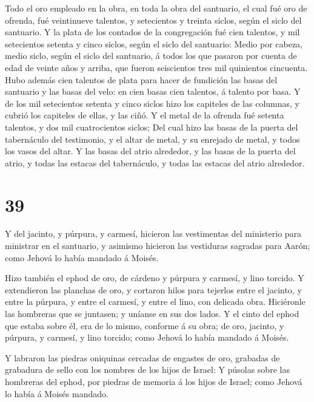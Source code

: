  Todo el oro empleado en la obra, en toda la obra del
santuario, el cual fué oro de ofrenda, fué veintinueve talentos, y
setecientos y treinta siclos, según el siclo del santuario.
 Y la plata de los contados de la congregación fué cien
talentos, y mil setecientos setenta y cinco siclos, según el siclo del
santuario:  Medio por cabeza, medio siclo, según el siclo
del santuario, á todos los que pasaron por cuenta de edad de veinte años
y arriba, que fueron seiscientos tres mil quinientos cincuenta.
 Hubo además cien talentos de plata para hacer de fundición
las basas del santuario y las basas del velo: en cien basas cien
talentos, á talento por basa.  Y de los mil setecientos
setenta y cinco siclos hizo los capiteles de las columnas, y cubrió los
capiteles de ellas, y las ciñó.  Y el metal de la ofrenda
fué setenta talentos, y dos mil cuatrocientos siclos;  Del
cual hizo las basas de la puerta del tabernáculo del testimonio, y el
altar de metal, y su enrejado de metal, y todos los vasos del altar.
 Y las basas del atrio alrededor, y las basas de la puerta
del atrio, y todas las estacas del tabernáculo, y todas las estacas del
atrio alrededor.

\hypertarget{section-38}{%
\section{39}\label{section-38}}

 Y del jacinto, y púrpura, y carmesí, hicieron las
vestimentas del ministerio para ministrar en el santuario, y asimismo
hicieron las vestiduras sagradas para Aarón; como Jehová lo había
mandado á Moisés.

 Hizo también el ephod de oro, de cárdeno y púrpura y
carmesí, y lino torcido.  Y extendieron las planchas de oro,
y cortaron hilos para tejerlos entre el jacinto, y entre la púrpura, y
entre el carmesí, y entre el lino, con delicada obra. 
Hiciéronle las hombreras que se juntasen; y uníanse en sus dos lados.
 Y el cinto del ephod que estaba sobre él, era de lo mismo,
conforme á su obra; de oro, jacinto, y púrpura, y carmesí, y lino
torcido; como Jehová lo había mandado á Moisés.

 Y labraron las piedras oniquinas cercadas de engastes de
oro, grabadas de grabadura de sello con los nombres de los hijos de
Israel:  Y púsolas sobre las hombreras del ephod, por
piedras de memoria á los hijos de Israel; como Jehová lo había á Moisés
mandado.

